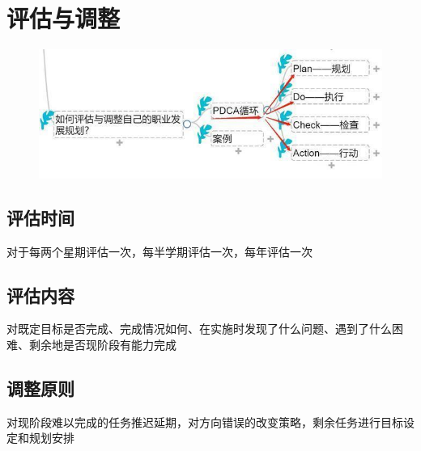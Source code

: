 \documentclass{article}
\begin{document}
\section{评估与调整}
	\begin{figure}[H]
	\centering
	\includegraphics[scale=0.6]{arrange.jpg}
	\end{figure}
\subsection{评估时间}
	对于每两个星期评估一次，每半学期评估一次，每年评估一次
\subsection{评估内容}
	对既定目标是否完成、完成情况如何、在实施时发现了什么问题、遇到了什么困难、剩余地是否现阶段有能力完成
\subsection{调整原则}
	对现阶段难以完成的任务推迟延期，对方向错误的改变策略，剩余任务进行目标设定和规划安排
\end{document}
